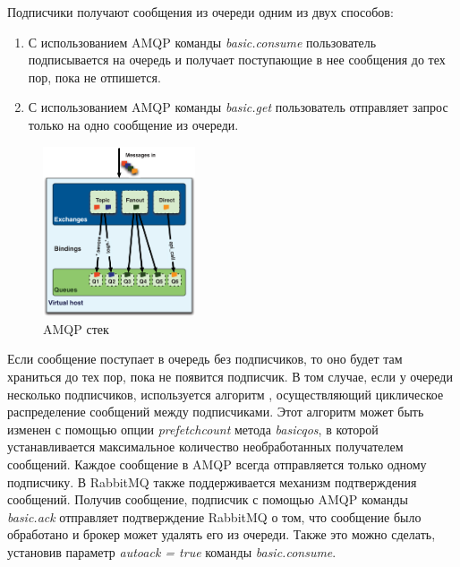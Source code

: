 Подписчики получают сообщения из очереди одним из двух способов:
\begin{enumerate}
  \item С использованием AMQP команды \textit{basic.consume} пользователь подписывается на очередь и получает поступающие в нее сообщения до тех пор, пока не отпишется. 
  \item С использованием AMQP команды \textit{basic.get} пользователь отправляет запрос только на одно сообщение из очереди. 
\end{enumerate}
\begin{figure}
\centering
\includegraphics[width=0.4\textwidth]{img/queues.png}
\caption{AMQP стек}
\label{fig:queues}
\end{figure}
Если сообщение поступает в очередь без подписчиков, то оно будет там храниться до тех пор, пока не появится подписчик. В том случае, если у очереди несколько подписчиков, используется алгоритм , осуществляющий циклическое распределение сообщений между подписчиками. Этот алгоритм может быть изменен с помощью опции \textit{prefetch\underline{\hspace{0.25cm}}count} метода \textit{basic\underline{\hspace{0.25cm}}qos}, в которой устанавливается максимальное количество необработанных получателем сообщений. Каждое сообщение в AMQP всегда отправляется только одному подписчику. В RabbitMQ также поддерживается механизм подтверждения сообщений. Получив сообщение, подписчик с помощью AMQP команды  \textit{basic.ack} отправляет подтверждение RabbitMQ о том, что сообщение было обработано и брокер может удалять его из очереди. Также это можно сделать, установив параметр \textit{auto\underline{\hspace{0.25cm}}ack = true} команды \textit{basic.consume}.

